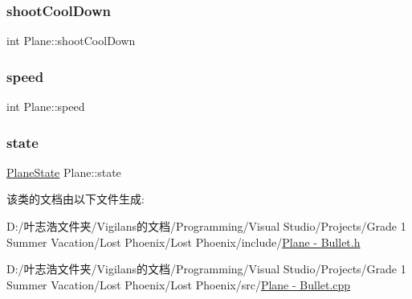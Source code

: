 \subsubsection{\texorpdfstring{shoot\+Cool\+Down}{shootCoolDown}}
{\footnotesize\ttfamily int Plane\+::shoot\+Cool\+Down}

\mbox{\label{class_plane_a6ca15b26a453dfd4f81fa11a5ee278c9}} 
\subsubsection{\texorpdfstring{speed}{speed}}
{\footnotesize\ttfamily int Plane\+::speed}

\mbox{\label{class_plane_a30babe177abbe22e61d2cc274945f3fc}} 
\subsubsection{\texorpdfstring{state}{state}}
{\footnotesize\ttfamily \hyperlink{_plane_01-_01_bullet_8h_a9f852e2715e13ec145d551659d2813bc}{Plane\+State} Plane\+::state\hspace{0.3cm}{\ttfamily [protected]}}



该类的文档由以下文件生成\+:\begin{DoxyCompactItemize}
\item 
D\+:/叶志浩文件夹/\+Vigilans的文档/\+Programming/\+Visual Studio/\+Projects/\+Grade 1 Summer Vacation/\+Lost Phoenix/\+Lost Phoenix/include/\hyperlink{_plane_01-_01_bullet_8h}{Plane -\/ Bullet.\+h}\item 
D\+:/叶志浩文件夹/\+Vigilans的文档/\+Programming/\+Visual Studio/\+Projects/\+Grade 1 Summer Vacation/\+Lost Phoenix/\+Lost Phoenix/src/\hyperlink{_plane_01-_01_bullet_8cpp}{Plane -\/ Bullet.\+cpp}\end{DoxyCompactItemize}
